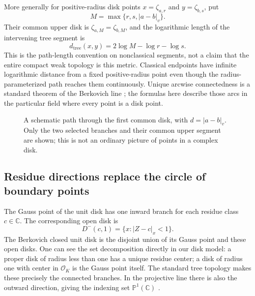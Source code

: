 \documentclass[11pt,a4paper]{article}
\numberwithin{equation}{section}
\theoremstyle{definition}
\theoremstyle{remark}
\newcommand{\C}{\mathbb C}
\newcommand{\OO}{\mathcal O}
\newcommand{\abs}[1]{\lvert#1\rvert}
\newcommand{\vabs}[1]{\lvert#1\rvert_v}
\begin{document}
More generally for positive-radius disk points $x=\zeta_{a,r}$ and
$y=\zeta_{b,s}$, put
\[
 M=\max\{r,s,\vabs{a-b}\}.
\]
Their common upper disk is $\zeta_{a,M}=\zeta_{b,M}$, and the logarithmic
length of the intervening tree segment is
\begin{equation}\label{eq:treedistance}
 d_{\mathrm{tree}}(x,y)=2\log M-\log r-\log s.
\end{equation}
This is the path-length convention on nonclassical segments, not a claim that
the entire compact weak topology is this metric. Classical endpoints have
infinite logarithmic distance from a fixed positive-radius point even though
the radius-parameterized path reaches them continuously. Unique arcwise
connectedness is a standard theorem of the Berkovich line
\cite[Sections I.6 and I.8]{PT}; the formulas here describe those arcs in the
particular field where every point is a disk point.

\begin{figure}[htbp]
\centering
{}
\caption{A schematic path through the first common disk, with
$d=\vabs{a-b}$. Only the two selected branches and their common upper segment are shown;
this is not an ordinary picture of points in a complex disk.}
\label{fig:tree}
\end{figure}

\subsection{Residue directions replace the circle of boundary points}
The Gauss point of the unit disk has one inward branch for each residue class
$c\in\C$. The corresponding open disk is
\[
 D^-(c,1)=\{x:\abs{Z-c}_x<1\}.
\]
The Berkovich closed unit disk is the disjoint union of its Gauss point and
these open disks. One can see the set decomposition directly in our disk
model: a proper disk of radius less than one has a unique residue center;
a disk of radius one with center in $\OO_K$ is the Gauss point itself.
The standard tree topology makes these precisely the connected branches.
In the projective line there is also the outward direction, giving the
indexing set $\mathbb P^1(\C)$ \cite[Sections I.3 and I.8]{PT}.
\end{document}
